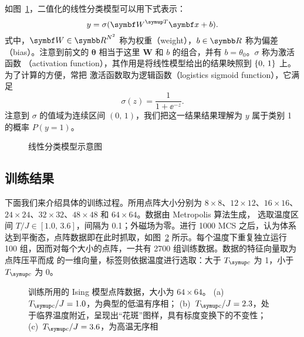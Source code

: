 如图~\ref{fig:linear-layer}，二值化的线性分类模型可以用下式表示：
\begin{equation}
  y = \sigma(\bm{W}^\trans \bm{x} + b).
\end{equation}
式中，$\bm{W}\in\R^{N^2}$ 称为权重（weight），$b\in\R$ 称为偏差（bias）。注意到前文的
$\bm{\theta}$ 相当于这里 $\bm{W}$ 和 $b$ 的组合，并有 $b=\theta_0$。$\sigma$ 称为激活函数
（activation function），其作用是将线性模型给出的结果映照到 ${\{0,\,1\}}$ 上。为了计算的方便，常把
激活函数取为逻辑函数（logistics sigmoid function），它满足
\begin{equation}
  \sigma(z) = \frac{1}{1+\ee^{-z}}.
\end{equation}
注意到 $\sigma$ 的值域为连续区间 $(0,\,1)$，我们把这一结果结果理解为 $y$ 属于类别 1 的概率
$P(y=1)$。

\begin{figure}[htb]
  \centering
  \caption{线性分类模型示意图}
  \label{fig:linear-layer}
\end{figure}

\subsection{训练结果}
\label{subsec:ising-linear-train-result}

下面我们来介绍具体的训练过程。所用点阵大小分别为 $8 \times 8$、$12 \times 12$、$16 \times 16$、
$24 \times 24$、$32 \times 32$、$48 \times 48$ 和 $64 \times 64$。数据由 Metropolis 算法生成，
选取温度区间 $T/J \in [1.0,\,3.6]$，间隔为 0.1；外磁场为零。进行 \num{1000} MCS 之后，认为体系
达到平衡态，点阵数据即在此时抓取，如图~\ref{fig:ising-lattice} 所示。每个温度下重复独立运行
\num{100} 组，因而对每个大小的点阵，一共有 \num{2700} 组训练数据。数据的特征向量取为点阵压平而成
的一维向量，标签则依据温度进行选取：大于 $\Tc$ 为 1，小于 $\Tc$ 为 0。

\begin{figure}[htb]
  \centering
  \begin{subfigure}[b]{0.3\textwidth}
    \centering
    \caption{}
  \end{subfigure}
  \begin{subfigure}[b]{0.3\textwidth}
    \centering
    \caption{}
  \end{subfigure}
  \begin{subfigure}[b]{0.3\textwidth}
    \centering
    \caption{}
  \end{subfigure}
  \caption{训练所用的 Ising 模型点阵数据，大小为 $64 \times 64$。
    (a)~$\Tc/J=1.0$，为典型的低温有序相；
    (b)~$\Tc/J=2.3$，处于临界温度附近，呈现出“花斑”图样，具有标度变换下的不变性；
    (c)~$\Tc/J=3.6$，为高温无序相}
  \label{fig:ising-lattice}
\end{figure}

